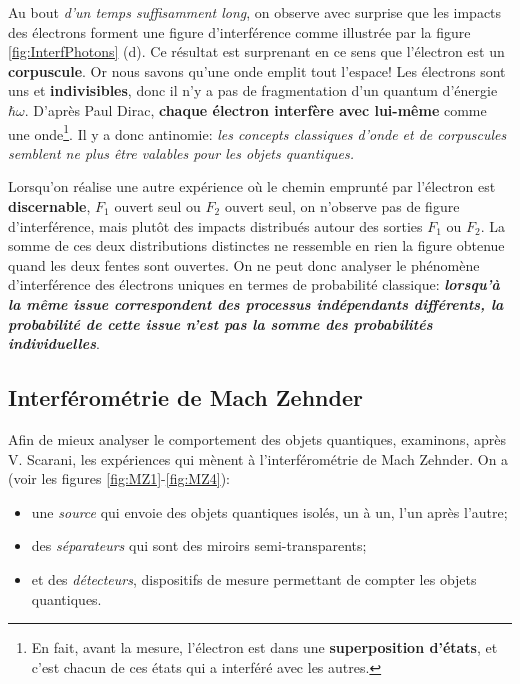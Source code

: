 Au bout \emph{d'un temps suffisamment long}, on observe avec surprise que les
impacts des électrons forment une figure d'interférence comme illustrée par la
figure \ref{fig:InterfPhotons} (d). Ce résultat est surprenant en ce sens que
l'électron est un \textbf{corpuscule}. Or nous savons qu'une onde emplit tout
l'espace! Les électrons sont uns et \textbf{indivisibles}, donc il n'y a pas de
fragmentation d'un quantum d'énergie $\hbar\omega$. D'après Paul Dirac,
\textbf{chaque électron interfère avec lui-même} comme une onde\footnote{En
fait, avant la mesure, l'électron est dans une \textbf{superposition d'états},
et c'est chacun de ces états qui a interféré avec les autres.}. Il y a donc
antinomie: \emph{les concepts classiques d'onde et de corpuscules semblent ne
plus être valables pour les objets quantiques.}

Lorsqu'on réalise une autre expérience où le chemin emprunté par l'électron est
\textbf{discernable}, $F_1$ ouvert seul ou $F_2$ ouvert seul, on n'observe
pas de figure d'interférence, mais plutôt des impacts distribués autour des
sorties $F_1$ ou $F_2$. La somme de ces deux distributions distinctes ne
ressemble en rien la figure obtenue quand les deux fentes sont ouvertes. On ne
peut donc analyser le phénomène d'interférence des électrons uniques en termes
de probabilité classique: \textbf{\emph{lorsqu'à la même issue correspondent des
processus indépendants différents, la probabilité de cette issue n'est pas la
somme des probabilités individuelles}}.

\subsection{Interférométrie de Mach Zehnder}
\label{sec:InterfMZ}

Afin de mieux analyser le comportement des objets quantiques, examinons, après
V. Scarani\cite{VSC2004}, les expériences qui mènent à l'interférométrie de Mach
Zehnder. On a (voir les figures \ref{fig:MZ1}-\ref{fig:MZ4}):
\begin{itemize}
\item une \emph{source} qui envoie des objets quantiques isolés, un à un, l'un
après l'autre;

\item des \emph{séparateurs} qui sont des miroirs semi-transparents;

 \item et des \emph{détecteurs}, dispositifs de mesure permettant de compter les
objets quantiques.
\end{itemize}

